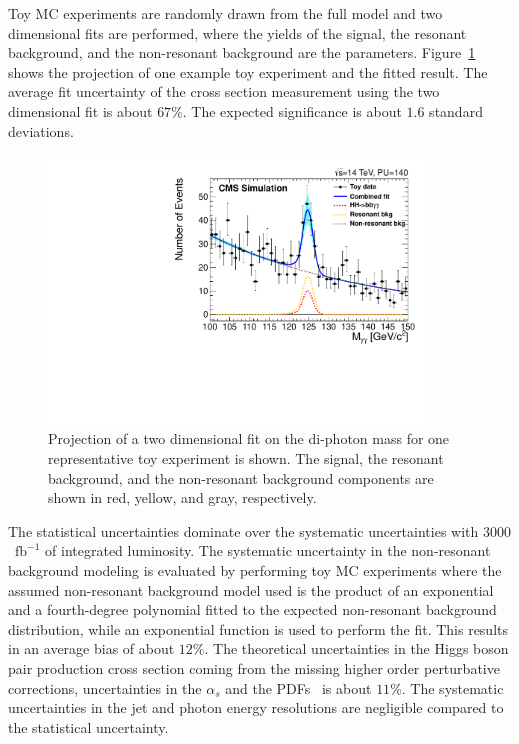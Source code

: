 Toy MC experiments are randomly drawn from the full model and two dimensional fits are performed, where the yields of the signal, the resonant background, and the non-resonant background are the parameters.  Figure~\ref{fig:twoDfullFitProjection} shows the projection of one example toy experiment and the fitted result. 
The average fit uncertainty of the cross section measurement using the two dimensional fit is about $67\%$. The expected significance is about $1.6$ standard deviations. 
\begin{figure}[h]
  \centering
  \includegraphics[width=0.9\textwidth]{figures_chapter6/hh_bbgg_mgg.pdf}
  \caption{Projection of a two dimensional fit on the di-photon mass for one representative
  toy experiment is shown. The signal, the resonant background, and the non-resonant background components are shown in 
  red, yellow, and gray, respectively.}
  \label{fig:twoDfullFitProjection}
\end{figure}
The statistical uncertainties dominate over the systematic uncertainties with $3000$~$\mathrm{fb}^{-1}$ of integrated luminosity. The systematic uncertainty in the non-resonant background modeling is evaluated by  performing toy MC experiments where the assumed non-resonant background model used is the product of an exponential and a fourth-degree polynomial fitted to the expected non-resonant background distribution, while an exponential function is used to perform the fit. This results in an
average bias of about $12\%$. The theoretical uncertainties in the Higgs boson pair production cross section coming from the missing higher order perturbative corrections, uncertainties in the $\alpha_{s}$ and the PDFs~\cite{Baglio:2012np} is about $11\%$. The systematic uncertainties in the jet and photon energy resolutions are negligible compared to the statistical uncertainty.

